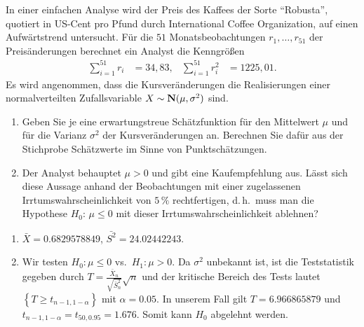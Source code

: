 In einer einfachen Analyse wird der
Preis des Kaffees der Sorte "`Robusta"', quotiert in US-Cent pro Pfund durch International
Coffee Organization, auf einen Aufwärtstrend untersucht. 
Für die $51$ Monatsbeobachtungen $r_{1},\dots ,r_{51}$ der Preisänderungen
berechnet ein Analyst die Kenngrößen
\begin{align*}
    \sum_{i=1}^{51} r_{i} &= 34,83, & \sum_{i=1}^{51} r^{2}_{i} &= 1225,01.
\end{align*}
Es wird angenommen, dass die Kursveränderungen die Realisierungen einer normalverteilten
Zufallsvariable $X\sim \mathbf N(\mu, \sigma^2)$ sind.
\begin{enumerate}
    \item Geben Sie je eine erwartungstreue Schätzfunktion für den Mittelwert
        $\mu$ und für die Varianz $\sigma^2$ der Kursveränderungen an.
        Berechnen Sie dafür aus der Stichprobe Schätzwerte im Sinne von
        Punktschätzungen.
    \item Der Analyst behauptet $\mu>0$ und gibt eine Kaufempfehlung aus. Lässt
        sich diese Aussage anhand der Beobachtungen mit einer zugelassenen
        Irrtumswahrscheinlichkeit von $5\,\%$ rechtfertigen, d.\,h.~muss man die
        Hypothese $H_0: \, \mu \le 0$ mit dieser Irrtums\-wahrscheinlichkeit
        ablehnen?
\end{enumerate}

\solution
\begin{enumerate}
    \item $\bar X = 0.6829578849$, $\bar{S^{2}} = 24.02442243$.
    \item Wir testen $H_0: \mu \leq 0$ vs.\ $H_1 : \mu > 0$. Da $\sigma^{2}$ unbekannt
        ist, ist die Teststatistik gegeben durch $T = \frac{\bar X_n}{ \sqrt{\bar S_n^2} } \sqrt{n}$
        und der kritische Bereich des Tests lautet $\left\{ T \geq t_{n-1, 1-\alpha} \right\}$
        mit $\alpha=0.05$. 
        In unserem Fall gilt $T = 6.966865879$ und $t_{n-1,1-\alpha}=
        t_{50,0.95} = 1.676$. Somit kann $H_0$ abgelehnt werden.
\end{enumerate}


